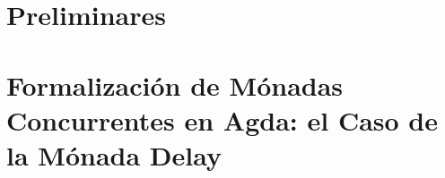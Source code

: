 \documentclass[a4paper,spanish,fixlanguage]{book}
\begin{document}
\frontmatter


\thispagestyle{empty}


\thispagestyle{empty}


\thispagestyle{empty}

\setcounter{tocdepth}{1}
\tableofcontents

\mainmatter



\part{Preliminares}\label{part:pre}





\part{Formalización de Mónadas Concurrentes en Agda: el Caso de la Mónada Delay}\label{part:mc}

 










\begin{appendices}

\end{appendices}
\end{document}
